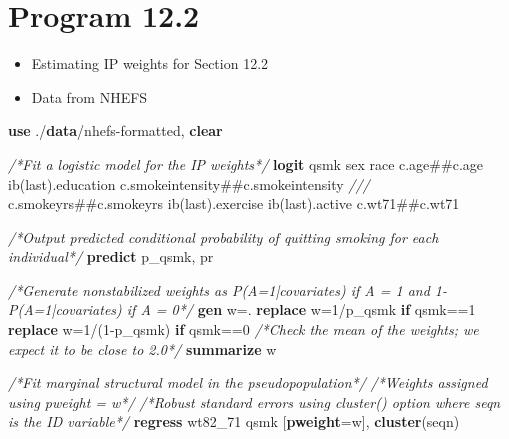 \documentclass[
  10pt,
]{book}
\newenvironment{Shaded}{\begin{snugshade}}{\end{snugshade}}
\newcommand{\CommentTok}[1]{\textcolor[rgb]{0.56,0.35,0.01}{\textit{#1}}}
\newcommand{\FunctionTok}[1]{\textcolor[rgb]{0.00,0.00,0.00}{#1}}
\newcommand{\KeywordTok}[1]{\textcolor[rgb]{0.13,0.29,0.53}{\textbf{#1}}}
\newcommand{\NormalTok}[1]{#1}
\providecommand{\tightlist}{%
  \setlength{\itemsep}{0pt}\setlength{\parskip}{0pt}}
\begin{document}
\hypertarget{program-12.2-1}{%
\section{Program 12.2}\label{program-12.2-1}}

\begin{itemize}
\tightlist
\item
  Estimating IP weights for Section 12.2
\item
  Data from NHEFS
\end{itemize}

\begin{Shaded}
\begin{Highlighting}[]
\KeywordTok{use}\NormalTok{ ./}\KeywordTok{data}\NormalTok{/nhefs{-}formatted, }\KeywordTok{clear}

\CommentTok{/*Fit a logistic model for the IP weights*/} 
\KeywordTok{logit}\NormalTok{ qsmk sex race c.age\#\#c.age ib(}\FunctionTok{last}\NormalTok{).education c.smokeintensity\#\#c.smokeintensity }\CommentTok{///}
\NormalTok{c.smokeyrs\#\#c.smokeyrs ib(}\FunctionTok{last}\NormalTok{).exercise ib(}\FunctionTok{last}\NormalTok{).active c.wt71\#\#c.wt71 }

\CommentTok{/*Output predicted conditional probability of quitting smoking for each individual*/}
\KeywordTok{predict}\NormalTok{ p\_qsmk, pr}

\CommentTok{/*Generate nonstabilized weights as P(A=1|covariates) if A = 1 and 1{-}P(A=1|covariates) if A = 0*/}
\KeywordTok{gen} \FunctionTok{w}\NormalTok{=.}
\KeywordTok{replace} \FunctionTok{w}\NormalTok{=1/p\_qsmk }\KeywordTok{if}\NormalTok{ qsmk==1}
\KeywordTok{replace} \FunctionTok{w}\NormalTok{=1/(1{-}p\_qsmk) }\KeywordTok{if}\NormalTok{ qsmk==0}
\CommentTok{/*Check the mean of the weights; we expect it to be close to 2.0*/}
\KeywordTok{summarize} \FunctionTok{w}

\CommentTok{/*Fit marginal structural model in the pseudopopulation*/}
\CommentTok{/*Weights assigned using pweight = w*/}
\CommentTok{/*Robust standard errors using cluster() option where \textquotesingle{}seqn\textquotesingle{} is the ID variable*/}
\KeywordTok{regress}\NormalTok{ wt82\_71 qsmk [}\KeywordTok{pweight}\NormalTok{=}\FunctionTok{w}\NormalTok{], }\KeywordTok{cluster}\NormalTok{(seqn) }
\end{Highlighting}
\end{Shaded}
\end{document}
